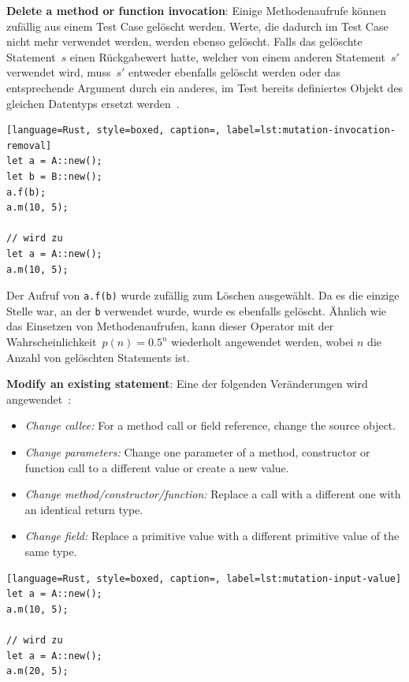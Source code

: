\documentclass{article}
\begin{document}
\textbf{Delete a method or function invocation}: Einige Methodenaufrufe können zufällig aus einem Test Case gelöscht werden. Werte, die dadurch im Test Case nicht mehr verwendet werden, werden ebenso gelöscht. Falls das gelöschte Statement~$s$ einen Rückgabewert hatte, welcher von einem anderen Statement~$s'$ verwendet wird, muss~$s'$ entweder ebenfalls gelöscht werden oder das entsprechende Argument durch ein anderes, im Test bereits definiertes Objekt des gleichen Datentyps ersetzt werden~\cite{Fraser2012}.
\begin{lstlisting}[language=Rust, style=boxed, caption=, label=lst:mutation-invocation-removal]
let a = A::new();
let b = B::new();
a.f(b);
a.m(10, 5);

// wird zu 
let a = A::new();
a.m(10, 5);
\end{lstlisting}
Der Aufruf von \lstinline{a.f(b)} wurde zufällig zum Löschen ausgewählt. Da es die einzige Stelle war, an der \lstinline{b} verwendet wurde, wurde es ebenfalls gelöscht. Ähnlich wie das Einsetzen von Methodenaufrufen, kann dieser Operator mit der Wahrscheinlichkeit~$p(n) = 0.5^n$ wiederholt angewendet werden, wobei $n$ die Anzahl von gelöschten Statements ist. 

\textbf{Modify an existing statement}: Eine der folgenden Veränderungen wird angewendet~\cite{Fraser2012}:
\begin{itemize}
  \item \textit{Change callee:} For a method call or field reference, change the source object.
  \item \textit{Change parameters:} Change one parameter of a method, constructor or function call to a different value or create a new value.
  \item \textit{Change method/constructor/function:} Replace a call with a different one with an identical return type.
  \item \textit{Change field:} Replace a primitive value with a different primitive value of the same type.
\end{itemize}
\begin{lstlisting}[language=Rust, style=boxed, caption=, label=lst:mutation-input-value]
let a = A::new();
a.m(10, 5);

// wird zu 
let a = A::new();
a.m(20, 5);
\end{lstlisting}
\end{document}
